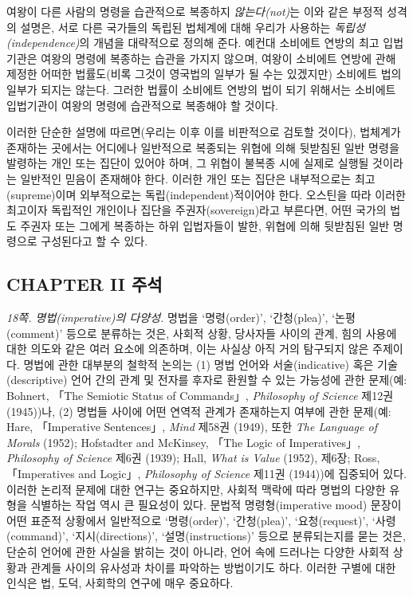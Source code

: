 \documentclass[12pt, oneside]{book}  %
\begin{document}
여왕이 다른 사람의 명령을 습관적으로 복종하지 \emph{않는다(not)}는 이와
같은 부정적 성격의 설명은, 서로 다른 국가들의 독립된 법체계에 대해
우리가 사용하는 \emph{독립성(independence)}의 개념을 대략적으로 정의해
준다. 예컨대 소비에트 연방의 최고 입법기관은 여왕의 명령에 복종하는
습관을 가지지 않으며, 여왕이 소비에트 연방에 관해 제정한 어떠한
법률도(비록 그것이 영국법의 일부가 될 수는 있겠지만) 소비에트 법의
일부가 되지는 않는다. 그러한 법률이 소비에트 연방의 법이 되기 위해서는
소비에트 입법기관이 여왕의 명령에 습관적으로 복종해야 할 것이다.

이러한 단순한 설명에 따르면(우리는 이후 이를 비판적으로 검토할 것이다),
법체계가 존재하는 곳에서는 어디에나 일반적으로 복종되는 위협에 의해
뒷받침된 일반 명령을 발령하는 개인 또는 집단이 있어야 하며, 그 위협이
불복종 시에 실제로 실행될 것이라는 일반적인 믿음이 존재해야 한다. 이러한
개인 또는 집단은 내부적으로는 최고(supreme)이며 외부적으로는
독립(independent)적이어야 한다. 오스틴을 따라 이러한 최고이자 독립적인
개인이나 집단을 주권자(sovereign)라고 부른다면, 어떤 국가의 법도 주권자
또는 그에게 복종하는 하위 입법자들이 발한, 위협에 의해 뒷받침된 일반
명령으로 구성된다고 할 수 있다.

\newpage

\subsection{CHAPTER II 주석}\label{chapter-ii-uxc8fcuxc11d}

\emph{18쪽. 명법(imperative)의 다양성.} 명법을 `명령(order)',
`간청(plea)', `논평(comment)' 등으로 분류하는 것은, 사회적 상황,
당사자들 사이의 관계, 힘의 사용에 대한 의도와 같은 여러 요소에 의존하며,
이는 사실상 아직 거의 탐구되지 않은 주제이다. 명법에 관한 대부분의
철학적 논의는 (1) 명법 언어와 서술(indicative) 혹은 기술(descriptive)
언어 간의 관계 및 전자를 후자로 환원할 수 있는 가능성에 관한 문제(예:
Bohnert, 「The Semiotic Status of Commands」, \emph{Philosophy of
Science} 제12권 (1945))나, (2) 명법들 사이에 어떤 연역적 관계가
존재하는지 여부에 관한 문제(예: Hare, 「Imperative Sentences」,
\emph{Mind} 제58권 (1949), 또한 \emph{The Language of Morals} (1952);
Hofstadter and McKinsey, 「The Logic of Imperatives」, \emph{Philosophy
of Science} 제6권 (1939); Hall, \emph{What is Value} (1952), 제6장;
Ross, 「Imperatives and Logic」, \emph{Philosophy of Science} 제11권
(1944))에 집중되어 있다. 이러한 논리적 문제에 대한 연구는 중요하지만,
사회적 맥락에 따라 명법의 다양한 유형을 식별하는 작업 역시 큰 필요성이
있다. 문법적 명령형(imperative mood) 문장이 어떤 표준적 상황에서
일반적으로 `명령(order)', `간청(plea)', `요청(request)',
`사령(command)', `지시(directions)', `설명(instructions)' 등으로
분류되는지를 묻는 것은, 단순히 언어에 관한 사실을 밝히는 것이 아니라,
언어 속에 드러나는 다양한 사회적 상황과 관계들 사이의 유사성과 차이를
파악하는 방법이기도 하다. 이러한 구별에 대한 인식은 법, 도덕, 사회학의
연구에 매우 중요하다.
\end{document}
